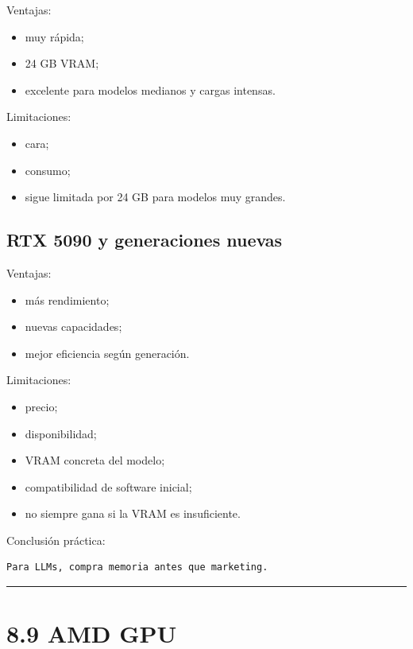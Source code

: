 Ventajas:

\begin{itemize}
\tightlist
\item
  muy rápida;
\item
  24 GB VRAM;
\item
  excelente para modelos medianos y cargas intensas.
\end{itemize}

Limitaciones:

\begin{itemize}
\tightlist
\item
  cara;
\item
  consumo;
\item
  sigue limitada por 24 GB para modelos muy grandes.
\end{itemize}

\subsection{RTX 5090 y generaciones
nuevas}\label{rtx-5090-y-generaciones-nuevas}

Ventajas:

\begin{itemize}
\tightlist
\item
  más rendimiento;
\item
  nuevas capacidades;
\item
  mejor eficiencia según generación.
\end{itemize}

Limitaciones:

\begin{itemize}
\tightlist
\item
  precio;
\item
  disponibilidad;
\item
  VRAM concreta del modelo;
\item
  compatibilidad de software inicial;
\item
  no siempre gana si la VRAM es insuficiente.
\end{itemize}

Conclusión práctica:

\begin{lstlisting}
Para LLMs, compra memoria antes que marketing.
\end{lstlisting}

\begin{center}\rule{0.5\linewidth}{0.5pt}\end{center}

\section{8.9 AMD GPU}\label{amd-gpu}

